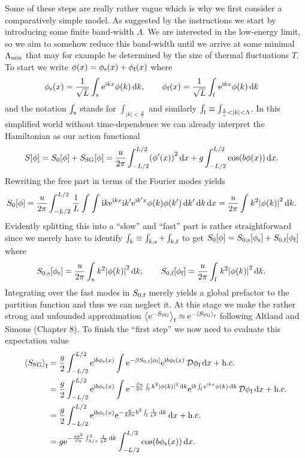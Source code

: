 \documentclass[english, parskip=full]{scrartcl}
\begin{document}
Some of these steps are really rather vague which is why we first consider a comparatively simple model.
As suggested by the instructions we start by introducing some finite band-width $\Lambda$.
We are interested in the low-energy limit, so we aim to somehow reduce this band-width until we arrive at some minimal $\Lambda_\Text{min}$ that may for example be determined by the size of thermal fluctuations $T$.\\
To start we write $\phi(x) = \phi_\s(x) + \phi_\f(x)$ where 
\begin{align}
\phi_\s(x) &= \frac{1}{\sqrt{L}} \intx{\s}{ }{ \powe{\i kx} \phi(k)}{k},\qquad \phi_\f(x) = \frac{1}{\sqrt{L}} \intx{\f}{ }{ \powe{\i kx} \phi(k)}{k}
\end{align}
and the notation $\int_\s$ stands for $\int_{|k| < \frac{\Lambda}{s}}$ and similarly $\int_\f \equiv \int_{\frac{\Lambda}{s}<|k|<\Lambda}$.
In this simplified world without time-dependence we can already interpret the Hamiltonian as our action functional
\begin{align}
S[\phi] &= S_0[\phi] + S_\Text{SG}[\phi] = \frac{u}{2\pi} \intx{-L/2}{L/2}{\kla*{\phi'(x)}^2}{x} + g \intx{-L/2}{L/2}{\cos\kla*{b\phi(x)}}{x}.
\end{align}
Rewriting the free part in terms of the Fourier modes yields
\begin{align}
S_0[\phi] &= \frac{u}{2\pi} \intx{-L/2}{L/2}{ \frac{1}{L}\intx{}{}{\intx{ }{ }{\i k \powe{\i kx} \i k'\powe{\i k' x} \phi(k)\phi(k')}{k'} }{k} }{x} = \frac{u}{2\pi} \intx{ }{ }{k^2 \abs*{\phi(k)}^2}{k}.
\end{align}
Evidently splitting this into a ``slow'' and ``fast'' part is rather straightforward since we merely have to identify $\int_k \equiv \int_{k,\s} + \int_{k,\f}$ to get $S_0[\phi] = S_{0,\s}[\phi_\s] + S_{0,\f}[\phi_\f]$ where
\begin{align}
S_{0,\s}[\phi_\s] &= \frac{u}{2\pi} \intx{\s}{ }{k^2 \abs*{\phi(k)}^2}{k}, \qquad S_{0,\f}[\phi_\f] = \frac{u}{2\pi} \intx{\f}{ }{k^2 \abs*{\phi(k)}^2}{k}.
\end{align}
Integrating over the fast modes in $S_{0,\f}$ merely yields a global prefactor to the partition function and thus we can neglect it.
At this stage we make the rather strong and unfounded approximation $\bra*{\powe{-S_\Text{SG}}}_\f\approx \powe{-\bra*{S_\Text{SG}}_\f}$ following Altland and Simons (Chapter 8).
To finish the ``first step'' we now need to evaluate this expectation value
\begin{align}
\bra*{S_\Text{SG}}_\f &= \frac{g}{2}\intx{-L/2}{L/2}{\powe{\i b \phi_\s(x)} \int \powe{-\beta S_{0,\f}[\phi_\f]} \powe{\i b\phi_\f(x)}\,\mathcal{D}\phi_\f }{x} + \hc \\
&= \frac{g}{2} \intx{-L/2}{L/2}{\powe{\i b\phi_\s(x)} \int \powe{-\frac{\beta u}{2\pi} \intx{\f}{ }{k^2 \abs*{\phi(k)}^2}{k} } \powe{\i b \intx{\f}{ }{ \powe{\i kx} \phi(k)}{k} } \,\mathcal{D}\phi_\f }{x} +\hc\\
&= \frac{g}{2} \intx{-L/2}{L/2}{\powe{\i b\phi_\s(x)} \powe{-\frac{\pi}{2\beta u} b^2 \intx{\f}{ }{\frac{1}{k^2}}{k} }}{x} + \hc\\
&= g \powe{-\frac{\pi b^2}{\beta u} \intx{\Lambda / s}{\Lambda}{\frac{1}{k^2}}{k} } \intx{-L/2}{L/2}{\cos\kla*{b\phi_\s(x)}}{x}.
\end{align}
\end{document}
